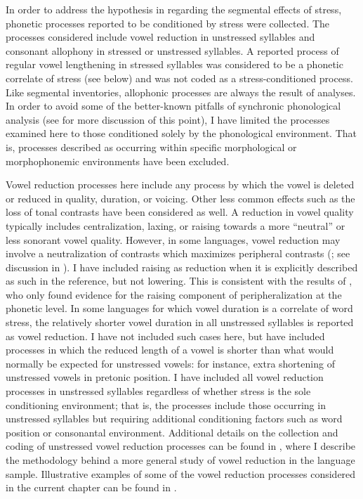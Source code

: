   In order to address the hypothesis in  regarding the segmental effects of stress, phonetic processes reported to be conditioned by stress were collected. The processes considered include vowel reduction in unstressed syllables and consonant allophony in stressed or unstressed syllables. A reported process of regular vowel lengthening in stressed syllables was considered to be a phonetic correlate of stress (see below) and was not coded as a stress-conditioned process. Like segmental inventories, allophonic processes are always the result of analyses. In order to avoid some of the better-known pitfalls of synchronic phonological analysis (see  for more discussion of this point), I have limited the processes examined here to those conditioned solely by the phonological environment. That is, processes described as occurring within specific morphological or morphophonemic environments have been excluded.

  Vowel reduction processes here include any process by which the vowel is deleted or reduced in quality, duration, or voicing. Other less common effects such as the loss of tonal contrasts have been considered as well. A reduction in vowel quality typically includes centralization, laxing, or raising towards a more ``neutral'' or less sonorant vowel quality. However, in some languages, vowel reduction may involve a neutralization of contrasts which maximizes peripheral contrasts (\citealt{Crosswhite2001}; see discussion in ). I have included raising as reduction when it is explicitly described as such in the reference, but not lowering. This is consistent with the results of \citet{KapatsinskiEtAl2019}, who only found evidence for the raising component of peripheralization at the phonetic level. In some languages for which vowel duration is a correlate of word stress, the relatively shorter vowel duration in all unstressed syllables is reported as vowel reduction. I have not included such cases here, but have included processes in which the reduced length of a vowel is shorter than what would normally be expected for unstressed vowels: for instance, extra shortening of unstressed vowels in pretonic position. I have included all vowel reduction processes in unstressed syllables regardless of whether stress is the sole conditioning environment; that is, the processes include those occurring in unstressed syllables but requiring additional conditioning factors such as word position or consonantal environment. Additional details on the collection and coding of unstressed vowel reduction processes can be found in , where I describe the methodology behind a more general study of vowel reduction in the language sample. Illustrative examples of some of the vowel reduction processes considered in the current chapter can be found in .

